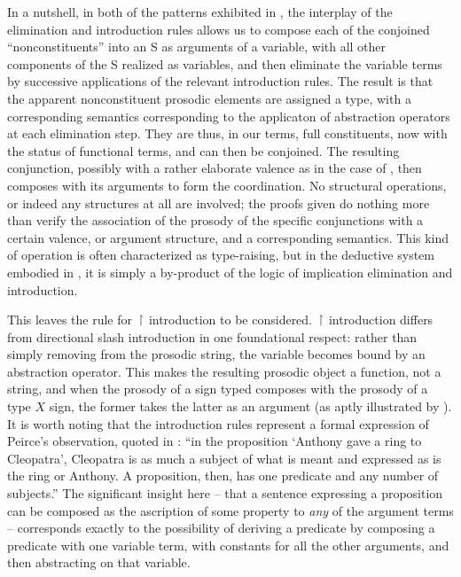 \documentclass[output=paper,colorlinks,citecolor=brown]{langscibook}
\begin{document}
In a nutshell, in both of the patterns exhibited in , the
interplay of the elimination and introduction rules allows us to
compose each of the conjoined ``nonconstituents'' into an S as arguments
of a variable, with all other components of the S realized as
variables, and then eliminate the variable terms by successive
applications of the relevant introduction rules. The result is that
the apparent nonconstituent prosodic elements are assigned a type,
with a corresponding semantics corresponding to the applicaton of
abstraction operators at each elimination step. They are thus, in our
terms, full constituents, now with the status of functional terms, and
can then be conjoined. The resulting conjunction, possibly with a
rather elaborate valence as in the case of , then composes with
its arguments to form the coordination. No structural operations, or
indeed any structures at all are involved; the proofs given do
nothing more than verify the association of the prosody of the
specific conjunctions with a certain valence, or argument structure,
and a corresponding semantics. This kind of operation is often
characterized as type-raising, but in the deductive system embodied in
, it is simply a by-product of the logic of implication
elimination and introduction.

This leaves the rule for \ensuremath{\vs} introduction to be considered. \ensuremath{\vs}
introduction differs from directional slash introduction in one
foundational respect: rather than simply removing \pt{ \ensuremath{\greekp} } from the
prosodic string, the variable becomes bound by an abstraction
operator. This makes the resulting prosodic object a function, not a
string, and when the prosody of a sign typed  composes with
the prosody of a type $X$ sign, the former takes the latter as an
argument (as aptly illustrated by ).  It is worth
noting that the introduction rules represent a formal expression of
Peirce's observation, quoted in \citet[8]{nothPeirce}: ``in the proposition
{`}Anthony gave a ring to Cleopatra', Cleopatra is as much a subject of what is
meant and expressed as is the ring or Anthony. A proposition, then,
has one predicate and any number of subjects.'' The significant insight
here -- that a sentence expressing a proposition can be composed as the
ascription of some property to \emph{any} of the argument
terms -- corresponds exactly to the possibility of deriving a predicate
by composing a predicate with one variable term, with constants for
all the other arguments, and then abstracting on that
variable.
\end{document}
